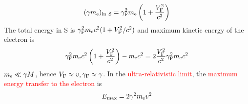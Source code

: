\documentclass[12pt,a4paper]{article}
\begin{document}
\begin{equation*}
(\gamma m_{\rm e})_{\rm in ~S} = \gamma_{\rm F}^2 m_{\rm e} \left(1 +\frac{V_{\rm F}^2}{c^2} \right)
\end{equation*}
The total energy in S is $\gamma_{\rm F}^2 m_{\rm e} c^2(1 + V_{\rm F}^2/c^2)$ and maximum kinetic energy of the electron is
\begin{equation}
\gamma_{\rm F}^2 m_{\rm e} c^2 \left(1 +\frac{V_{\rm F}^2}{c^2} \right) -m_{\rm e} c^2 = 2\frac{V_{\rm F}^2}{c^2} \gamma_{\rm F}^2 m_{\rm e} c^2
\end{equation}
$m_{\rm e} \ll \gamma M$, hence $V_{\rm F} \approx v, \gamma_{\rm F} \approx \gamma$. In the \textcolor{red}{ultra-relativistic limit}, the \textcolor{red}{maximum energy transfer to the electron} is
\begin{equation*}
E_{\rm max} = 2\gamma^2 m_{\rm e} v^2
\end{equation*}







\end{document}
